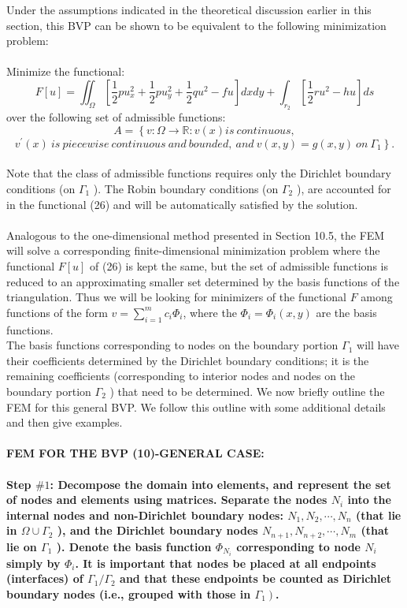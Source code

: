 \documentclass[../main.tex]{subfiles}
\begin{document}
Under the assumptions indicated in the theoretical discussion earlier in this 
section, this BVP can be shown to be equivalent to the following minimization 
problem: 
\\
\\
Minimize the functional: 
\begin{equation}
F[u]=\iint_{\Omega}\left[\frac{1}{2} p u_{x}^{2}+\frac{1}{2} p u_{y}^{2}+\frac{1}{2} q u^{2}-f u\right] d x d y+\int_{r_{2}}\left[\frac{1}{2} r u^{2}-h u\right] d s
\end{equation}
over the following set of admissible functions: 
\begin{equation}
A=\left\{v: \Omega \rightarrow \mathbb{R}: v(x)\right. is~ continuous,
\end{equation}
$$ v^{\prime}(x) ~is~piecewise~continuous~and~ bounded,~and~ v(x, y)=g(x, y) ~on~ \left.\Gamma_{1}\right\}.$$
\\
Note that the class of admissible functions requires only the Dirichlet boundary conditions (on $\Gamma_{1}$ ). The Robin boundary conditions (on $\Gamma_{2}$ ), are accounted for in the functional (26) and will be automatically satisfied by the solution.
\\
\\
Analogous to the one-dimensional method presented in Section 10.5, the FEM will solve a corresponding finite-dimensional minimization problem where the functional $F[u]$ of (26) is kept the same, but the set of admissible functions is reduced to an approximating smaller set determined by the basis functions of the triangulation. Thus we will be looking for minimizers of the functional $F$ among functions of the form $v=\sum_{i=1}^{m} c_{i} \Phi_{i}$, where the $\Phi_{i}=\Phi_{i}(x, y)$ are the basis functions.\\
The basis functions corresponding to nodes on the boundary portion $\Gamma_{1}$ will have their coefficients determined by the Dirichlet boundary conditions; it is the remaining coefficients (corresponding to interior nodes and nodes on the boundary portion $\Gamma_{2}$ ) that need to be determined. We now briefly outline the FEM for this general BVP. We follow this outline with some additional details and then give examples.
\\
\\
\textbf{FEM FOR THE BVP (10)-GENERAL CASE:}\\
\\
\textbf{Step $\#1$: Decompose the domain into elements, and represent the set of nodes and elements using matrices. Separate the nodes $N_{i}$ into the internal nodes and non-Dirichlet boundary nodes: $N_{1}, N_{2}, \cdots, N_{n}$ (that lie in $\Omega \cup \Gamma_{2}$ ), and the Dirichlet boundary nodes $N_{n+1}, N_{n+2}, \cdots, N_{m}$ (that lie on $\Gamma_{1}$ ). Denote the basis function $\Phi_{N_{i}}$ corresponding to node $N_{i}$ simply by $\Phi_{i}$. It is important that nodes be placed at all endpoints (interfaces) of $\Gamma_{1} / \Gamma_{2}$ and that these endpoints be counted as Dirichlet boundary nodes (i.e., grouped with those in $\left.\Gamma_{1}\right)$.}
\end{document}

